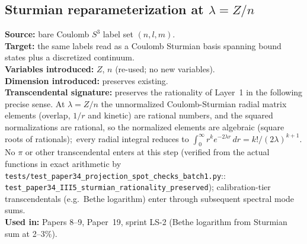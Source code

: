 \documentclass[11pt]{article}
\begin{document}
\subsection{Sturmian reparameterization at $\lambda = Z/n$}
\label{sec:proj_sturmian}
\textbf{Source:} bare Coulomb $S^3$ label set $(n,l,m)$.\\
\textbf{Target:} the same labels read as a Coulomb Sturmian basis
spanning bound states plus a discretized continuum.\\
\textbf{Variables introduced:} $Z$, $n$ (re-used; no new variables).\\
\textbf{Dimension introduced:} preserves existing.\\
\textbf{Transcendental signature:} preserves the rationality of
Layer~1 in the following precise sense.  At $\lambda = Z/n$ the
unnormalized Coulomb-Sturmian radial matrix elements (overlap, $1/r$
and kinetic) are rational numbers, and the squared normalizations are
rational, so the normalized elements are algebraic (square roots of
rationals);\ every radial integral reduces to
$\int_0^\infty r^k e^{-2\lambda r}\,dr = k!/(2\lambda)^{k+1}$.  No $\pi$
or other transcendental enters at this step (verified from the actual
functions in exact arithmetic by
\texttt{tests/test\_paper34\_projection\_spot\_checks\_batch1.py}::\allowbreak
\texttt{test\_paper34\_III5\_sturmian\_rationality\_preserved});
calibration-tier transcendentals (e.g.\ Bethe logarithm) enter
through subsequent spectral mode sums.\\
\textbf{Used in:} Papers 8--9, Paper~19, sprint LS-2 (Bethe logarithm
from Sturmian sum at 2--3\%).
\end{document}
